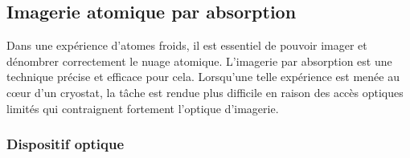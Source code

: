 

		
	\subsection{Imagerie atomique par absorption}
	
\noindent Dans une expérience d'atomes froids, il est essentiel de pouvoir imager et dénombrer correctement le nuage atomique.
L'imagerie par absorption est une technique précise et efficace pour cela.
Lorsqu'une telle expérience est menée au c\oe ur d'un cryostat, la tâche est rendue plus difficile en raison des accès optiques limités qui contraignent fortement l'optique d'imagerie.

	\subsubsection*{Dispositif optique}

